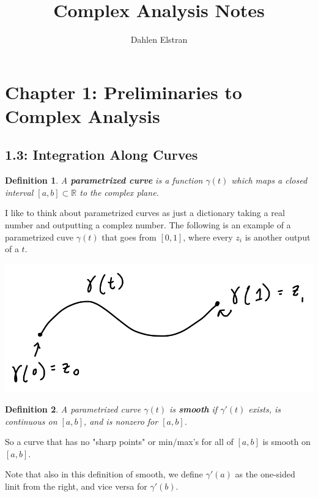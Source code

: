 \documentclass[12pt]{article}
\newtheorem{definition}{Definition}
\begin{document}
 
\title{Complex Analysis Notes} 
\author{Dahlen Elstran} 
\maketitle

\section*{Chapter 1: Preliminaries to Complex Analysis}

\subsection*{1.3: Integration Along Curves}

\begin{definition}
  A \textbf{parametrized curve} is a function $\gamma(t)$ which maps a closed interval $[a,b] \subset \mathbb{R}$ 
  to the complex plane.
\end{definition}

I like to think about parametrized curves as just a dictionary taking a real number and outputting a complez number. 
The following is an example of a parametrized cuve $\gamma(t)$ that goes from $[0,1]$, where every $z_i$ is another output of a $t$. 
\begin{center} \includegraphics[scale=.3]{8150.1.png} \end{center}

\begin{definition}
  A parametrized curve $\gamma(t)$ is \textbf{smooth} if $\gamma'(t)$ exists, is continuous on $[a,b]$, and is nonzero for $[a,b]$.
\end{definition}

So a curve that has no "sharp points" or min/max's for all of $[a,b]$ is smooth on $[a,b]$.

Note that also in this definition of smooth, we define $\gamma'(a)$ as the one-sided linit from the right, and vice versa for $\gamma'(b)$. 
\end{document}

